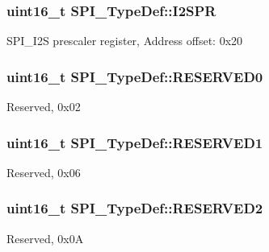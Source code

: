\subsubsection[{\texorpdfstring{I2\+S\+PR}{I2SPR}}]{ uint16\+\_\+t S\+P\+I\+\_\+\+Type\+Def\+::\+I2\+S\+PR}\hypertarget{struct_s_p_i___type_def_aecee11b0d2e534b5243e9db6a0e10026}{}\label{struct_s_p_i___type_def_aecee11b0d2e534b5243e9db6a0e10026}
S\+P\+I\+\_\+\+I2S prescaler register, Address offset\+: 0x20 
\subsubsection[{\texorpdfstring{R\+E\+S\+E\+R\+V\+E\+D0}{RESERVED0}}]{\setlength{\rightskip}{0pt plus 5cm}uint16\+\_\+t S\+P\+I\+\_\+\+Type\+Def\+::\+R\+E\+S\+E\+R\+V\+E\+D0}\hypertarget{struct_s_p_i___type_def_a7f16c40933b8a713085436be72d30a46}{}\label{struct_s_p_i___type_def_a7f16c40933b8a713085436be72d30a46}
Reserved, 0x02 
\subsubsection[{\texorpdfstring{R\+E\+S\+E\+R\+V\+E\+D1}{RESERVED1}}]{\setlength{\rightskip}{0pt plus 5cm}uint16\+\_\+t S\+P\+I\+\_\+\+Type\+Def\+::\+R\+E\+S\+E\+R\+V\+E\+D1}\hypertarget{struct_s_p_i___type_def_a1b7a800c0f56532a431b19cf868e4102}{}\label{struct_s_p_i___type_def_a1b7a800c0f56532a431b19cf868e4102}
Reserved, 0x06 
\subsubsection[{\texorpdfstring{R\+E\+S\+E\+R\+V\+E\+D2}{RESERVED2}}]{\setlength{\rightskip}{0pt plus 5cm}uint16\+\_\+t S\+P\+I\+\_\+\+Type\+Def\+::\+R\+E\+S\+E\+R\+V\+E\+D2}\hypertarget{struct_s_p_i___type_def_a09ce56649bb5477e2fcf3e92bca8f735}{}\label{struct_s_p_i___type_def_a09ce56649bb5477e2fcf3e92bca8f735}
Reserved, 0x0A 
